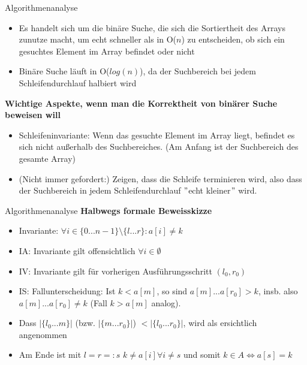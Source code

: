 \begin{frame}{Algorithmenanalyse}
	\begin{itemize}
		\item Es handelt sich um die binäre Suche, die sich die Sortiertheit des Arrays zunutze macht, um echt schneller als in O($n$) zu entscheiden, ob sich ein gesuchtes Element im Array befindet oder nicht
		\pause
		\item Binäre Suche läuft in O($log(n)$), da der Suchbereich bei jedem Schleifendurchlauf halbiert wird
		\pause
	\end{itemize}
	\textbf{Wichtige Aspekte, wenn man die Korrektheit von binärer Suche beweisen will}
	\begin{itemize}
		\pause
		\item Schleifeninvariante: Wenn das gesuchte Element im Array liegt, befindet es sich nicht außerhalb des Suchbereiches. (Am Anfang ist der Suchbereich des gesamte Array)
		\pause
		\item (Nicht immer gefordert:) Zeigen, dass die Schleife terminieren wird, also dass der Suchbereich in jedem Schleifendurchlauf $"$echt kleiner$"$ wird.
	\end{itemize}
\end{frame}

\begin{frame}{Algorithmenanalyse}
	\textbf{Halbwegs formale Beweisskizze} \\[0,125cm]
	\pause
	\begin{itemize}
		\item Invariante: $\forall i \in \{0 ... n-1\} \setminus \{l ... r\}: a[i] \neq k$
		\pause
		\item IA: Invariante gilt offensichtlich $\forall i \in \emptyset$
		\pause
		\item IV: Invariante gilt für vorherigen Ausführungsschritt $(l_0, r_0)$
		\pause
		\item IS: Fallunterscheidung: Ist $k < a[m]$, so sind $a[m] ... a[r_0] > k$, insb. also $a[m] ... a[r_0] \neq k$ (Fall $k > a[m]$ analog).
		\pause
		\item Dass $ | \{l_0 ... m\} | $ (bzw. $ | \{m ... r_0\} | $) $ < | \{l_0 ... r_0\} | $, wird als ersichtlich angenommen
		\pause
		\item Am Ende ist mit $l = r =: s$ $k \neq a[i] \forall i \neq s$ und somit $k \in A \Leftrightarrow a[s] = k$
	\end{itemize}
\end{frame}

